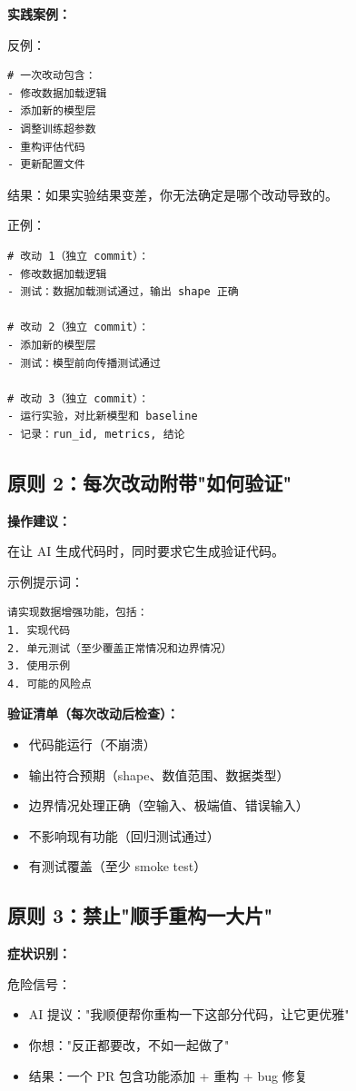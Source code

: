 \textbf{实践案例：}

反例：
\begin{verbatim}
# 一次改动包含：
- 修改数据加载逻辑
- 添加新的模型层
- 调整训练超参数
- 重构评估代码
- 更新配置文件
\end{verbatim}
结果：如果实验结果变差，你无法确定是哪个改动导致的。

正例：
\begin{verbatim}
# 改动 1（独立 commit）：
- 修改数据加载逻辑
- 测试：数据加载测试通过，输出 shape 正确

# 改动 2（独立 commit）：
- 添加新的模型层
- 测试：模型前向传播测试通过

# 改动 3（独立 commit）：
- 运行实验，对比新模型和 baseline
- 记录：run_id, metrics, 结论
\end{verbatim}

\subsection{原则 2：每次改动附带"如何验证"}

\textbf{操作建议：}

在让 AI 生成代码时，同时要求它生成验证代码。

示例提示词：
\begin{verbatim}
请实现数据增强功能，包括：
1. 实现代码
2. 单元测试（至少覆盖正常情况和边界情况）
3. 使用示例
4. 可能的风险点
\end{verbatim}

\textbf{验证清单（每次改动后检查）：}
\begin{itemize}
  \item[$\square$] 代码能运行（不崩溃）
  \item[$\square$] 输出符合预期（shape、数值范围、数据类型）
  \item[$\square$] 边界情况处理正确（空输入、极端值、错误输入）
  \item[$\square$] 不影响现有功能（回归测试通过）
  \item[$\square$] 有测试覆盖（至少 smoke test）
\end{itemize}

\subsection{原则 3：禁止"顺手重构一大片"}

\textbf{症状识别：}

危险信号：
\begin{itemize}
  \item AI 提议："我顺便帮你重构一下这部分代码，让它更优雅"
  \item 你想："反正都要改，不如一起做了"
  \item 结果：一个 PR 包含功能添加 + 重构 + bug 修复
\end{itemize}

